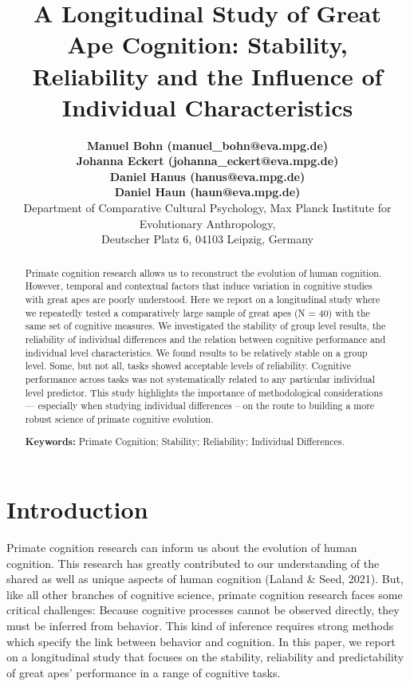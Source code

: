 \documentclass[10pt, letterpaper]{article}
\title{A Longitudinal Study of Great Ape Cognition: Stability, Reliability and
the Influence of Individual Characteristics}
\author{{\large \bf Manuel Bohn (manuel\_bohn@eva.mpg.de)} \\ {\large \bf Johanna Eckert (johanna\_eckert@eva.mpg.de)} \\ {\large \bf Daniel Hanus (hanus@eva.mpg.de)} \\ {\large \bf Daniel Haun (haun@eva.mpg.de)} \\ Department of Comparative Cultural Psychology, Max Planck Institute for Evolutionary Anthropology, \\ Deutscher Platz 6, 04103 Leipzig, Germany}
\begin{document}
\maketitle

\begin{abstract}
Primate cognition research allows us to reconstruct the evolution of
human cognition. However, temporal and contextual factors that induce
variation in cognitive studies with great apes are poorly understood.
Here we report on a longitudinal study where we repeatedly tested a
comparatively large sample of great apes (N = 40) with the same set of
cognitive measures. We investigated the stability of group level
results, the reliability of individual differences and the relation
between cognitive performance and individual level characteristics. We
found results to be relatively stable on a group level. Some, but not
all, tasks showed acceptable levels of reliability. Cognitive
performance across tasks was not systematically related to any
particular individual level predictor. This study highlights the
importance of methodological considerations --- especially when studying
individual differences -- on the route to building a more robust science
of primate cognitive evolution.

\textbf{Keywords:}
Primate Cognition; Stability; Reliability; Individual Differences.
\end{abstract}

\hypertarget{introduction}{%
\section{Introduction}\label{introduction}}

Primate cognition research can inform us about the evolution of human
cognition. This research has greatly contributed to our understanding of
the shared as well as unique aspects of human cognition (Laland \& Seed,
2021). But, like all other branches of cognitive science, primate
cognition research faces some critical challenges: Because cognitive
processes cannot be observed directly, they must be inferred from
behavior. This kind of inference requires strong methods which specify
the link between behavior and cognition. In this paper, we report on a
longitudinal study that focuses on the stability, reliability and
predictability of great apes' performance in a range of cognitive tasks.
\end{document}
